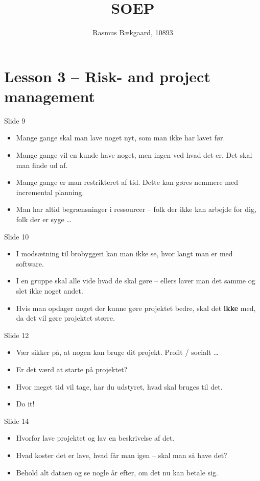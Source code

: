 \documentclass[a4, 10pt]{article}
\title{SOEP}
\author{Rasmus Bækgaard, 10893}
\begin{document}
\maketitle

\section*{Lesson 3 -- Risk- and project management}

Slide 9
\begin{itemize}
\item Mange gange skal man lave noget nyt, som man ikke har lavet før.
\item Mange gange vil en kunde have noget, men ingen ved hvad det er. Det skal man finde ud af.
\item Mange gange er man restrikteret af tid. 
	Dette kan gøres nemmere med incremental planning.
\item Man har altid begrænsninger i ressourcer -- folk der ikke kan arbejde for dig, folk der er syge \dots
\end{itemize} 
Slide 10
\begin{itemize}
	\item I modsætning til brobyggeri kan man ikke se, hvor langt man er med software.
	\item I en gruppe skal alle vide hvad de skal gøre -- ellers laver man det samme og slet ikke noget andet.
	\item Hvis man opdager noget der kunne gøre projektet bedre, skal det \textbf{ikke} med, da det vil gøre projektet større.
\end{itemize}
Slide 12
\begin{itemize}
	\item Vær sikker på, at nogen kan bruge dit projekt. Profit / socialt \dots
	\item Er det værd at starte på projektet?
	\item Hvor meget tid vil tage, har du udstyret, hvad skal bruges til det.
	\item Do it!
\end{itemize}
Slide 14
\begin{itemize}
	\item Hvorfor lave projektet og lav en beskrivelse af det.
	\item Hvad koster det er lave, hvad får man igen -- skal man så have det?
	\item Behold alt dataen og se nogle år efter, om det nu kan betale sig.
\end{itemize}
\end{document}
